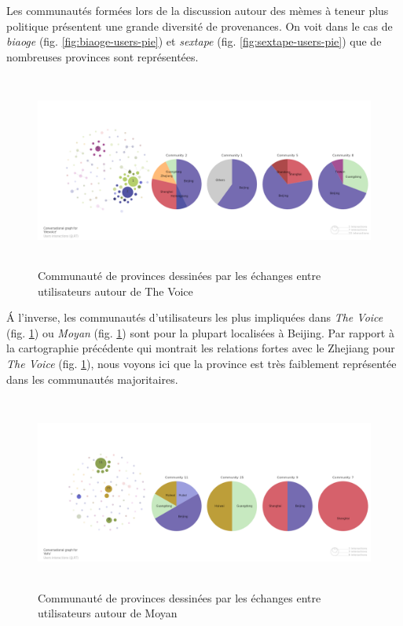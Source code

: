 Les communaut\'es form\'ees lors de la discussion autour des m\`emes \`a
teneur plus politique pr\'esentent une grande diversit\'e de
provenances. On voit dans le cas de \textit{biaoge} (fig. \ref{fig:biaoge-users-pie}) et \textit{sextape} (fig. \ref{fig:sextape-users-pie}) que de nombreuses provinces sont repr\'esent\'ees. 


\begin{figure}[H]
    \centering
    \includegraphics[width=5.9996in,height=2.5004in]{figures/chap4/chapitre4-img56.png}
    \caption{
        Communaut\'e de provinces dessin\'ees par les \'echanges entre utilisateurs autour de The Voice
    }
    \label{fig:voice-users-pie}
\end{figure}

 \'A l{\textquoteright}inverse, les communaut\'es d{\textquoteright}utilisateurs les plus impliqu\'ees dans \textit{The Voice } (fig. \ref{fig:voice-users-pie}) ou \textit{Moyan} (fig. \ref{fig:voice-users-pie}) sont pour la plupart localis\'ees \`a Beijing. Par rapport \`a la cartographie pr\'ec\'edente qui montrait les relations fortes avec le Zhejiang pour \textit{The Voice} (fig. \ref{fig:voice-users-pie}), nous voyons ici que la province est tr\`es faiblement repr\'esent\'ee dans les communaut\'es majoritaires. 

\begin{figure}[H]
  \centering
   \includegraphics[width=5.9996in,height=2.5004in]{figures/chap4/chapitre4-img57.png}
    \caption{
        Communaut\'e de provinces dessin\'ees par les \'echanges entre utilisateurs autour de Moyan
    }
    \label{fig:moyan-users-pie}
\end{figure}


